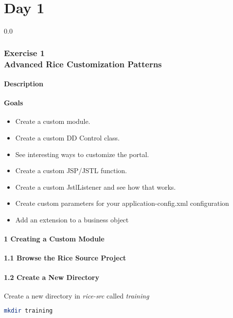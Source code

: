 \part{Day 1}
{}
{\setlength{\baselineskip}%
  {0.0\baselineskip}
  \section*{\flushright Exercise 1\\Advanced Rice Customization Patterns}
  \hrulefill \par}

\subsection*{Description}

\subsection*{Goals}
\begin{itemize}
  \item Create a custom module.
  \item Create a custom DD Control class.
  \item See interesting ways to customize the portal.
  \item Create a custom JSP/JSTL function.
  \item Create a custom JstlListener and see how that works.
  \item Create custom parameters for your application-config.xml
    configuration
  \item Add an extension to a business object
\end{itemize}

\subsection*{1 Creating a Custom Module}

\subsection*{1.1 Browse the Rice Source Project}

\subsection*{1.2 Create a New Directory}
Create a new directory in \emph{rice-src} called \emph{training}
\begin{lstlisting}[language=bash,backgroundcolor=\color{ubergray},caption={Directory creation for Linux
    users},frame=single,breaklines=true]
  mkdir training
\end{lstlisting}

